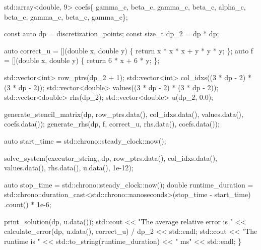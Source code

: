\begin{DoxyCodeInclude}
    std::array<double, 9> coefs\{
        gamma\_c, beta\_c, gamma\_c,
    beta\_c, alpha\_c, beta\_c,
        gamma\_c, beta\_c, gamma\_c\};

    \textcolor{keyword}{const} \textcolor{keyword}{auto} dp = discretization\_points;
    \textcolor{keyword}{const} \textcolor{keywordtype}{size\_t} dp\_2 = dp * dp;

    \textcolor{keyword}{auto} correct\_u = [](\textcolor{keywordtype}{double} x, \textcolor{keywordtype}{double} y) \{ \textcolor{keywordflow}{return} x * x * x + y * y * y; \};
    \textcolor{keyword}{auto} f = [](\textcolor{keywordtype}{double} x, \textcolor{keywordtype}{double} y) \{ \textcolor{keywordflow}{return} 6 * x + 6 * y; \};

    std::vector<int> row\_ptrs(dp\_2 + 1);
    std::vector<int> col\_idxs((3 * dp - 2) * (3 * dp - 2));
    std::vector<double> values((3 * dp - 2) * (3 * dp - 2));
    std::vector<double> rhs(dp\_2);
    std::vector<double> u(dp\_2, 0.0);

    generate\_stencil\_matrix(dp, row\_ptrs.data(), col\_idxs.data(), values.data(),
                            coefs.data());
    generate\_rhs(dp, f, correct\_u, rhs.data(), coefs.data());

    \textcolor{keyword}{auto} start\_time = std::chrono::steady\_clock::now();

    solve\_system(executor\_string, dp, row\_ptrs.data(), col\_idxs.data(),
                 values.data(), rhs.data(), u.data(), 1e-12);

    \textcolor{keyword}{auto} stop\_time = std::chrono::steady\_clock::now();
    \textcolor{keywordtype}{double} runtime\_duration =
        std::chrono::duration\_cast<std::chrono::nanoseconds>(stop\_time -
                                                             start\_time)
            .count() *
        1e-6;

    print\_solution(dp, u.data());
    std::cout << \textcolor{stringliteral}{"The average relative error is "}
              << calculate\_error(dp, u.data(), correct\_u) / dp\_2 << std::endl;
    std::cout << \textcolor{stringliteral}{"The runtime is "} << std::to\_string(runtime\_duration) << \textcolor{stringliteral}{" ms"}
              << std::endl;
\}
\end{DoxyCodeInclude}
 